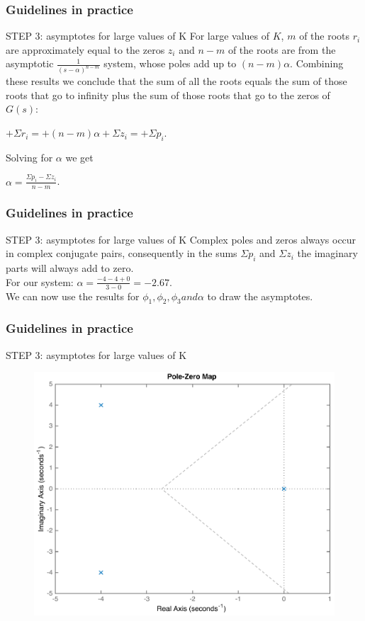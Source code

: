 \begin{frame}
	\frametitle{Guidelines in practice}
	\begin{block}{STEP 3: asymptotes for large values of K}
		For large values of $K$, $m$ of the roots $r_i$ are approximately equal to the zeros $z_i$ and $n-m$ of the roots are from the asymptotic $\frac{1}{(s-\alpha)^{n-m}}$ system, whose poles add up to $(n-m)\alpha$. Combining these results we conclude that the sum of all the roots equals the sum of those roots that go to infinity plus the sum of those roots that go to the zeros of $G(s)$:
		\begin{center}
			$+\Sigma r_i = + (n-m)\alpha + \Sigma z_i = +\Sigma p_i$.
		\end{center}
		Solving for $\alpha$ we get 
		\begin{center}
			$\alpha = \frac{\Sigma p_i - \Sigma z_i}{n-m}$.
		\end{center}
	\end{block}
\end{frame}

\begin{frame}
	\frametitle{Guidelines in practice}
	\begin{block}{STEP 3: asymptotes for large values of K}
		Complex poles and zeros always occur in complex conjugate pairs, consequently in the sums $\Sigma p_i$ and $\Sigma z_i$ the imaginary parts will always add to zero.\\
		\vspace{1em}
		For our system: $\alpha = \frac{-4-4+0}{3-0} = -2.67.$\\
		\vspace{1em}
		We can now use the results for $\phi_1, \phi_2, \phi_3 and \alpha$ to draw the asymptotes. 
	\end{block}
\end{frame}

\begin{frame}
\frametitle{Guidelines in practice}
	\begin{block}{STEP 3: asymptotes for large values of K}
		\begin{figure}
			\centering
			\includegraphics[width=0.6\linewidth]{how_to_draw_ex3}
		\end{figure}
	\end{block}
\end{frame}

